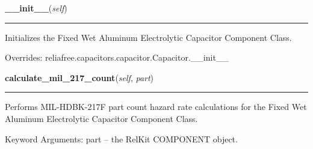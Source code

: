 \hspace{.8\funcindent}\begin{boxedminipage}{\funcwidth}

    \raggedright \textbf{\_\_init\_\_}(\textit{self})

    \vspace{-1.5ex}

    \rule{\textwidth}{0.5\fboxrule}
\setlength{\parskip}{2ex}
    Initializes the Fixed Wet Aluminum Electrolytic Capacitor Component 
    Class.

\setlength{\parskip}{1ex}
      Overrides: reliafree.capacitors.capacitor.Capacitor.\_\_init\_\_

    \end{boxedminipage}

    \label{reliafree:capacitors:electrolytic:Aluminum:calculate_mil_217_count}

    \vspace{0.5ex}

\hspace{.8\funcindent}\begin{boxedminipage}{\funcwidth}

    \raggedright \textbf{calculate\_mil\_217\_count}(\textit{self}, \textit{part})

    \vspace{-1.5ex}

    \rule{\textwidth}{0.5\fboxrule}
\setlength{\parskip}{2ex}
    Performs MIL-HDBK-217F part count hazard rate calculations for the 
    Fixed Wet Aluminum Electrolytic Capacitor Component Class.

    Keyword Arguments: part -- the RelKit COMPONENT object.

\setlength{\parskip}{1ex}
    \end{boxedminipage}

    \label{reliafree:capacitors:electrolytic:Aluminum:calculate_mil_217_stress}

    \vspace{0.5ex}

